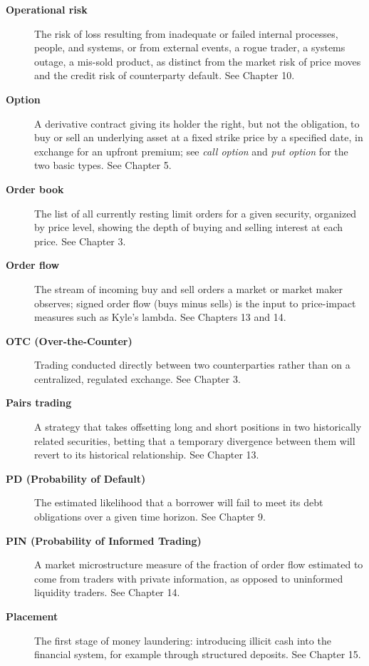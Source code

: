 \documentclass[../ai_in_finance]{subfiles}
\begin{document}
\begin{description}
\item[\textbf{Operational risk}] The risk of loss resulting from inadequate or failed internal processes, people, and systems, or from external events, a rogue trader, a systems outage, a mis-sold product, as distinct from the market risk of price moves and the credit risk of counterparty default. See Chapter 10.

\item[\textbf{Option}] A derivative contract giving its holder the right, but not the obligation, to buy or sell an underlying asset at a fixed strike price by a specified date, in exchange for an upfront premium; see \emph{call option} and \emph{put option} for the two basic types. See Chapter 5.

\item[\textbf{Order book}] The list of all currently resting limit orders for a given security, organized by price level, showing the depth of buying and selling interest at each price. See Chapter 3.

\item[\textbf{Order flow}] The stream of incoming buy and sell orders a market or market maker observes; signed order flow (buys minus sells) is the input to price-impact measures such as Kyle's lambda. See Chapters 13 and 14.

\item[\textbf{OTC (Over-the-Counter)}] Trading conducted directly between two counterparties rather than on a centralized, regulated exchange. See Chapter 3.

\item[\textbf{Pairs trading}] A strategy that takes offsetting long and short positions in two historically related securities, betting that a temporary divergence between them will revert to its historical relationship. See Chapter 13.

\item[\textbf{PD (Probability of Default)}] The estimated likelihood that a borrower will fail to meet its debt obligations over a given time horizon. See Chapter 9.


\item[\textbf{PIN (Probability of Informed Trading)}] A market microstructure measure of the fraction of order flow estimated to come from traders with private information, as opposed to uninformed liquidity traders. See Chapter 14.

\item[\textbf{Placement}] The first stage of money laundering: introducing illicit cash into the financial system, for example through structured deposits. See Chapter 15.


\end{description}
\end{document}
